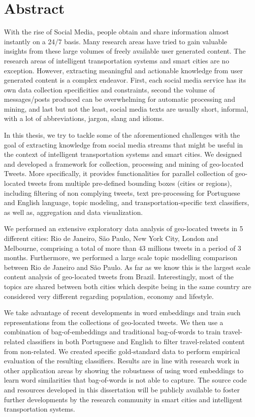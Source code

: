 \chapter*{Abstract}

With the rise of Social Media, people obtain and share information almost instantly on a 24/7 basis. Many research areas have tried to gain valuable insights from these large volumes of freely available user generated content. The research areas of intelligent transportation systems and smart cities are no exception. However, extracting meaningful and actionable knowledge from user generated content is a complex endeavor. First, each social media service has its own data collection specificities and constraints, second the volume of messages/posts produced can be overwhelming for automatic processing and mining, and last but not the least, social media texts are usually short, informal, with a lot of abbreviations, jargon, slang and idioms.
 
In this thesis, we try to tackle some of the aforementioned challenges with the goal of extracting knowledge from social media streams that might be useful in the context of intelligent transportation systems and smart cities. We designed and developed a framework for collection, processing and mining of geo-located Tweets. More specifically, it provides functionalities for parallel collection of geo-located tweets from multiple pre-defined bounding boxes (cities or regions), including filtering of non complying tweets, text pre-processing for Portuguese and English language, topic modeling, and transportation-specific text classifiers, as well as, aggregation and data visualization.

We performed an extensive exploratory data analysis of geo-located tweets in 5 different cities: Rio de Janeiro, São Paulo, New York City, London and Melbourne, comprising a total of more than 43 millions tweets in a period of 3 months. Furthermore, we performed a large scale topic modelling comparison between Rio de Janeiro and São Paulo. As far as we know this is the largest scale content analysis of geo-located tweets from Brazil. Interestingly, most of the topics are shared between both cities which despite being in the same country are considered very different regarding population, economy and lifestyle.

We take advantage of recent developments in word embeddings and train such representations from the collections of geo-located tweets. We then use a combination of bag-of-embeddings and traditional bag-of-words to train travel-related classifiers in both Portuguese and English to filter travel-related content from non-related. We created specific gold-standard data to perform empirical evaluation of the resulting classifiers. Results are in line with research work in other application areas by showing the robustness of using word embeddings to learn word similarities that bag-of-words is not able to capture. The source code and resources developed in this dissertation will be publicly available to foster further developments by the research community in smart cities and intelligent transportation systems.


